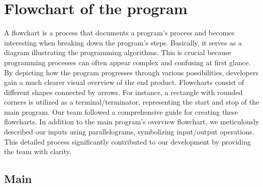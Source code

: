\section{Flowchart of the program}

A flowchart is a process that documents a program's process and becomes
interesting when breaking down the program's steps.
Basically, it serves as a diagram illustrating the programming algorithms.
This is crucial because programming processes can often appear
complex and confusing at first glance.
By depicting how the program progresses through various possibilities,
developers gain a much clearer visual overview of the end product.
Flowcharts consist of different shapes connected by arrows.
For instance, a rectangle with rounded corners is utilized as a
terminal/terminator, representing the start and stop of the main program.
Our team followed a comprehensive guide for creating these flowcharts.
In addition to the main program's overview flowchart,
we meticulously described our inputs using parallelograms, symbolizing input/output operations.
This detailed process significantly contributed to our development by providing the team with clarity.




\newpage
\subsection{Main}
\noindent
\begin{center}
\end{center}


